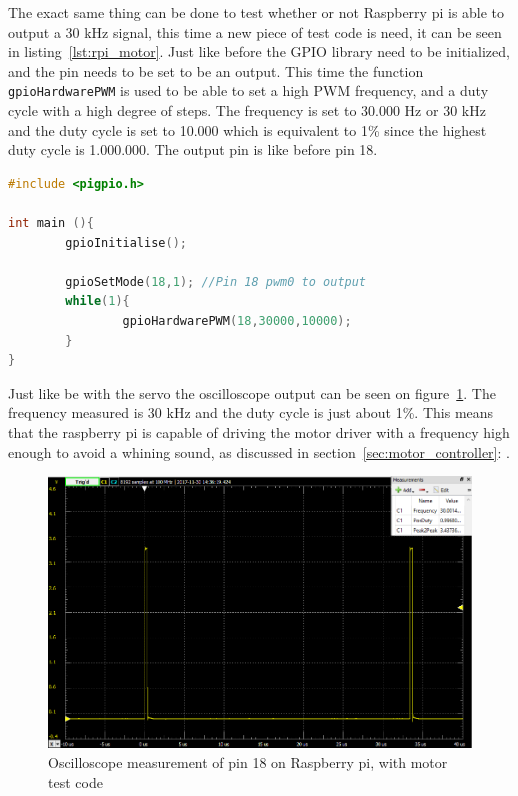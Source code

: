 The exact same thing can be done to test whether or not Raspberry pi is able to output a 30 kHz signal, this time a new piece of test code is need, it can be seen in listing~\ref{lst:rpi_motor}. Just like before the GPIO library need to be initialized, and the pin needs to be set to be an output. This time the function \texttt{gpioHardwarePWM} is used to be able to set a high PWM frequency, and a duty cycle with a high degree of steps. The frequency is set to 30.000 Hz or 30 kHz and the duty cycle is set to 10.000 which is equivalent to 1\% since the highest duty cycle is 1.000.000. The output pin is like before pin 18.

\begin{lstlisting}[caption = {Test code to make the Raspberry pi run a motor a 30kHz}, captionpos=b, label={lst:rpi_servo}, 
language=C++,firstnumber=1]
#include <pigpio.h>

int main (){
        gpioInitialise();

        gpioSetMode(18,1); //Pin 18 pwm0 to output
        while(1){
                gpioHardwarePWM(18,30000,10000);
        }
}
\end{lstlisting}

Just like be with the servo the oscilloscope output can be seen on figure~\ref{fig:rpi_motor_pwm}. The frequency measured is 30 kHz and the duty cycle is just about 1\%. This means that the raspberry pi is capable of driving the motor driver with a frequency high enough to avoid a whining sound, as discussed in section~\ref{sec:motor_controller}: .

\begin{figure}[H]
\centering
\includegraphics[width=0.7\linewidth]{Images/Implementation/RPI_motor_PWM}
\caption{Oscilloscope measurement of pin 18 on Raspberry pi, with motor test code}
\label{fig:rpi_motor_pwm}
\end{figure}


